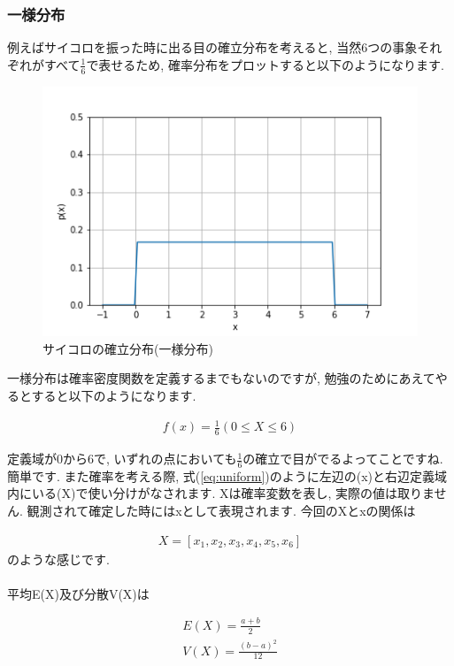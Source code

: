 \documentclass[11pt,a4paper]{jreport}
\begin{document}
\subsubsection{一様分布}
例えばサイコロを振った時に出る目の確立分布を考えると, 当然6つの事象それぞれがすべて$\frac{1}{6}$で表せるため, 確率分布をプロットすると以下のようになります.\\
\begin{figure}[H]
\label{im:uniform}
  \centering
  \includegraphics[width=120mm,bb=0 0 432 288]{figures/uniform.png}
  \caption{サイコロの確立分布(一様分布)}
\end{figure}

一様分布は確率密度関数を定義するまでもないのですが, 勉強のためにあえてやるとすると以下のようになります.

\begin{eqnarray}
\label{eq:uniform}
f(x) = \frac{1}{6} (0 \leq X \leq 6)
\end{eqnarray}

定義域が0から6で, いずれの点においても$\frac{1}{6}$の確立で目がでるよってことですね. 簡単です. また確率を考える際, 式(\ref{eq:uniform})のように左辺の(x)と右辺定義域内にいる(X)で使い分けがなされます. Xは確率変数を表し, 実際の値は取りません. 観測されて確定した時にはxとして表現されます. 今回のXとxの関係は

\begin{eqnarray}
X = [x_1, x_2, x_3, x_4, x_5, x_6]
\end{eqnarray}
のような感じです. \\
\\
平均E(X)及び分散V(X)は

\begin{eqnarray}
E(X) = \frac{a+b}{2}\\
V(X) = \frac{(b-a)^2}{12}
\end{eqnarray}
\end{document}
